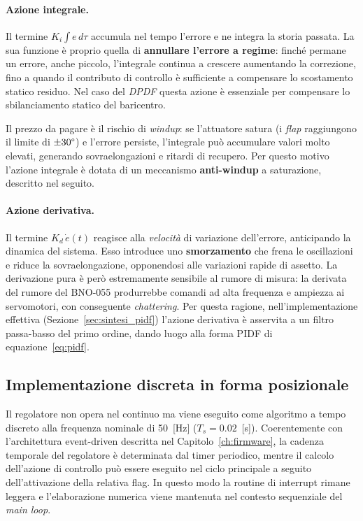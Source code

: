 \documentclass[11pt]{report}
\begin{document}
\paragraph{Azione integrale.}
Il termine $K_i \int e\, d\tau$ accumula nel tempo l'errore e ne integra la storia passata. La sua funzione è proprio quella di \textbf{annullare l'errore a regime}: finché permane un errore, anche piccolo, l'integrale continua a crescere aumentando la correzione, fino a quando il contributo di controllo è sufficiente a compensare lo scostamento statico residuo. Nel caso del \textit{DPDF} questa azione è essenziale per compensare lo sbilanciamento statico del baricentro.

Il prezzo da pagare è il rischio di \textit{windup}: se l'attuatore satura (i \textit{flap} raggiungono il limite di $\pm 30\degree$) e l'errore persiste, l'integrale può accumulare valori molto elevati, generando sovraelongazioni e ritardi di recupero. Per questo motivo l'azione integrale è dotata di un meccanismo \textbf{anti-windup} a saturazione, descritto nel seguito.

\paragraph{Azione derivativa.}
Il termine $K_d \, \dot e(t)$ reagisce alla \textit{velocità} di variazione dell'errore, anticipando la dinamica del sistema. Esso introduce uno \textbf{smorzamento} che frena le oscillazioni e riduce la sovraelongazione, opponendosi alle variazioni rapide di assetto. La derivazione pura è però estremamente sensibile al rumore di misura: la derivata del rumore del BNO-055 produrrebbe comandi ad alta frequenza e ampiezza ai servomotori, con conseguente \textit{chattering}. Per questa ragione, nell'implementazione effettiva (Sezione~\ref{sec:sintesi_pidf}) l'azione derivativa è asservita a un filtro passa-basso del primo ordine, dando luogo alla forma PIDF di equazione~\eqref{eq:pidf}.

\subsection{Implementazione discreta in forma posizionale}
\label{sec:pid_posizionale}

Il regolatore non opera nel continuo ma viene eseguito come algoritmo a tempo discreto alla frequenza nominale di 50~[Hz] ($T_s = 0.02$~[s]). Coerentemente con l'architettura event-driven descritta nel Capitolo~\ref{ch:firmware}, la cadenza temporale del regolatore è determinata dal timer periodico, mentre il calcolo dell'azione di controllo può essere eseguito nel ciclo principale a seguito dell'attivazione della relativa flag. In questo modo la routine di interrupt rimane leggera e l'elaborazione numerica viene mantenuta nel contesto sequenziale del \textit{main loop}.
\end{document}
